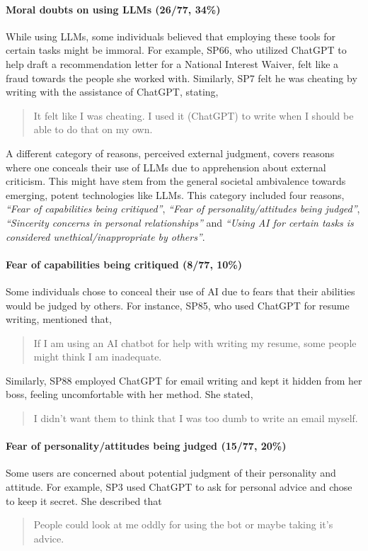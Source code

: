 \paragraph{Moral doubts on using LLMs (26/77, 34\%)} 
While using LLMs, some individuals believed that employing these tools for certain tasks might be immoral.
For example, SP66, who utilized ChatGPT to help draft a recommendation letter for a National Interest Waiver, felt like a fraud towards the people she worked with.
Similarly, SP7 felt he was cheating by writing with the assistance of ChatGPT, stating,~\blockquote{It felt like I was cheating. I used it (ChatGPT) to write when I should be able to do that on my own.}

A different category of reasons, perceived external judgment, covers reasons where one conceals their use of LLMs due to apprehension about external criticism.
This might have stem from the general societal ambivalence towards emerging, potent technologies like LLMs.
This category included four reasons, \textit{``Fear of capabilities being critiqued''}, \textit{``Fear of personality/attitudes being judged''}, \textit{``Sincerity concerns in personal relationships''} and \textit{``Using AI for certain tasks is considered unethical/inappropriate by others''}.


\paragraph{Fear of capabilities being critiqued (8/77, 10\%)} 
Some individuals chose to conceal their use of AI due to fears that their abilities would be judged by others. 
For instance, SP85, who used ChatGPT for resume writing, mentioned that,~\blockquote{If I am using an AI chatbot for help with writing my resume, some people might think I am inadequate.}
Similarly, SP88 employed ChatGPT for email writing and kept it hidden from her boss, feeling uncomfortable with her method.
She stated,~\blockquote{I didn't want them to think that I was too dumb to write an email myself.}

\paragraph{Fear of personality/attitudes being judged (15/77, 20\%)} 
Some users are concerned about potential judgment of their personality and attitude.
For example, SP3 used ChatGPT to ask for personal advice and chose to keep it secret.
She described that~\blockquote{People could look at me oddly for using the bot or maybe taking it's advice.}


